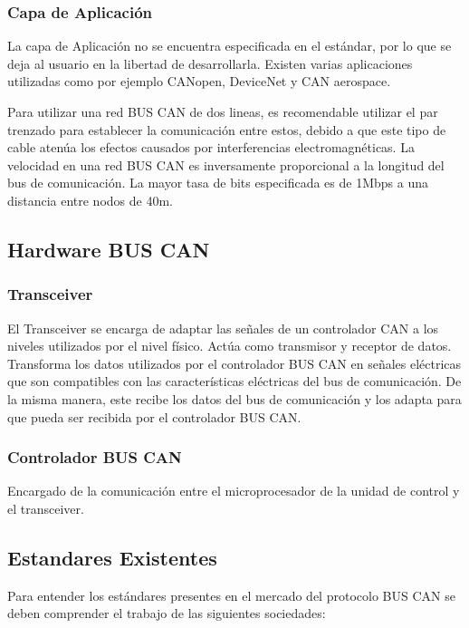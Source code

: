 \subsubsection {Capa de Aplicación}

La capa de Aplicación no se encuentra especificada en el estándar, por lo que se deja al usuario en la libertad de desarrollarla.
Existen varias aplicaciones utilizadas como por ejemplo CANopen, DeviceNet y CAN aerospace. 

Para utilizar una red BUS CAN de dos lineas, es recomendable utilizar el par trenzado para establecer la comunicación entre estos, debido a que este tipo de cable atenúa los efectos causados por interferencias electromagnéticas. 
La velocidad en una red  BUS CAN es inversamente proporcional a la longitud del bus de comunicación. La mayor tasa de bits especificada es de 1Mbps a una distancia entre nodos de 40m. 

\subsection {Hardware BUS CAN}

\subsubsection{Transceiver}

El Transceiver se encarga de adaptar las señales de un controlador CAN  a los niveles utilizados por el nivel físico. Actúa como transmisor y receptor de datos. Transforma los datos utilizados por el controlador BUS CAN en señales eléctricas que son compatibles con las características eléctricas del bus de comunicación. De la misma manera, este recibe los datos del bus de comunicación y los adapta para que pueda ser recibida por el controlador BUS CAN.

\subsubsection {Controlador BUS CAN}

Encargado de la comunicación entre el microprocesador de la unidad de control y el transceiver. 
 
\subsection{Estandares Existentes}

Para entender los estándares presentes en el mercado del protocolo BUS CAN se deben comprender el trabajo de las siguientes sociedades:

